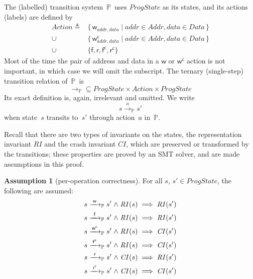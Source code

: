 \documentclass[letterpaper,twocolumn,10pt]{article}
\theoremstyle{definition}
\newtheorem{assumption}[theorem]{Assumption}
\newcommand{\defeq}{{}\triangleq{}}
\newcommand{\conj}{\mathrel\land}
\newcommand{\awa}[2]{\hphantom{#1}\mathclap{#2}\hphantom{#1}} %
\renewcommand{\i}[1]{\ensuremath{\mathit{#1}}}
\newcommand{\Prog}{\ensuremath{\mathbb P}}
\newcommand{\actw}{\mathsf w}
\newcommand{\actwc}{\mathsf w^\mathsf{c}}
\newcommand{\actf}{\mathsf f}
\newcommand{\actr}{\mathsf r}
\newcommand{\actfc}{\mathsf{f^c}}
\newcommand{\actrc}{\mathsf{r^c}}
\newcommand{\ttIn}[2]{\xrightarrow{#1}_{#2}}
\newcommand{\ttP}[1]{\ttIn{#1}{\Prog}}
\begin{document}
The (labelled) transition system~\Prog\ uses \i{ProgState} as its states, and its actions (labels) are defined by%
\begin{align*}
	\i{Action} \defeq{} &\{\, \actw_{\i{addr}, \i{data}} \mid \i{addr} \in \i{Addr}, \i{data} \in \i{Data} \,\} \\
	\cup \ &\{\, \actwc_{\i{addr}, \i{data}} \mid \i{addr} \in \i{Addr}, \i{data} \in \i{Data} \,\}\\
	\cup \ &\{ \actf, \actr, \actfc, \actrc \}
\end{align*}
Most of the time the pair of address and data in a $\actw$ or $\actwc$ action is not important, in which case we will omit the subscript.
The ternary (single-step) transition relation of~\Prog\ is
$${\ttP{}} \subseteq \i{ProgState} \times \i{Action} \times \i{ProgState}$$
Its exact definition is, again, irrelevant and omitted.
We write
$$s \ttP{a} s'$$
when state~$s$ transits to~$s'$ through action~$a$ in~\Prog.

Recall that there are two types of invariants on the states, the representation invariant \i{RI} and the crash invariant \i{CI}, which are preserved or transformed by the transitions; these properties are proved by an SMT solver, and are made assumptions in this proof.
\begin{assumption}[per-operation correctness]
For all $s$, $s' \in \i{ProgState}$, the following are assumed:
\begin{align*}
s \ttP{\awa{\actw}{\actw }} s' \conj \i{RI}(s) &\implies \i{RI}(s')\\
s \ttP{\awa{\actw}{\actf }} s' \conj \i{RI}(s) &\implies \i{RI}(s')\\
s \ttP{\awa{\actw}{\actwc}} s' \conj \i{RI}(s) &\implies \i{CI}(s')\\
s \ttP{\awa{\actw}{\actfc}} s' \conj \i{RI}(s) &\implies \i{CI}(s')\\
s \ttP{\awa{\actw}{\actr }} s' \conj \i{CI}(s) &\implies \i{RI}(s')\\
s \ttP{\awa{\actw}{\actrc}} s' \conj \i{CI}(s) &\implies \i{CI}(s')
\end{align*}
\end{assumption}
\end{document}
